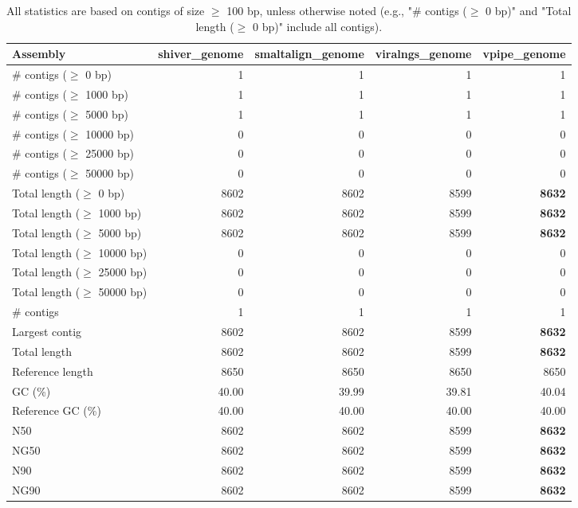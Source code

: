 \documentclass[12pt,a4paper]{article}
\begin{document}
\begin{table}[ht]
\begin{center}
\caption{All statistics are based on contigs of size $\geq$ 100 bp, unless otherwise noted (e.g., "\# contigs ($\geq$ 0 bp)" and "Total length ($\geq$ 0 bp)" include all contigs).}
\begin{tabular}{|l*{4}{|r}|}
\hline
Assembly & shiver\_genome & smaltalign\_genome & viralngs\_genome & vpipe\_genome \\ \hline
\# contigs ($\geq$ 0 bp) & 1 & 1 & 1 & 1 \\ \hline
\# contigs ($\geq$ 1000 bp) & 1 & 1 & 1 & 1 \\ \hline
\# contigs ($\geq$ 5000 bp) & 1 & 1 & 1 & 1 \\ \hline
\# contigs ($\geq$ 10000 bp) & 0 & 0 & 0 & 0 \\ \hline
\# contigs ($\geq$ 25000 bp) & 0 & 0 & 0 & 0 \\ \hline
\# contigs ($\geq$ 50000 bp) & 0 & 0 & 0 & 0 \\ \hline
Total length ($\geq$ 0 bp) & 8602 & 8602 & 8599 & {\bf 8632} \\ \hline
Total length ($\geq$ 1000 bp) & 8602 & 8602 & 8599 & {\bf 8632} \\ \hline
Total length ($\geq$ 5000 bp) & 8602 & 8602 & 8599 & {\bf 8632} \\ \hline
Total length ($\geq$ 10000 bp) & 0 & 0 & 0 & 0 \\ \hline
Total length ($\geq$ 25000 bp) & 0 & 0 & 0 & 0 \\ \hline
Total length ($\geq$ 50000 bp) & 0 & 0 & 0 & 0 \\ \hline
\# contigs & 1 & 1 & 1 & 1 \\ \hline
Largest contig & 8602 & 8602 & 8599 & {\bf 8632} \\ \hline
Total length & 8602 & 8602 & 8599 & {\bf 8632} \\ \hline
Reference length & 8650 & 8650 & 8650 & 8650 \\ \hline
GC (\%) & 40.00 & 39.99 & 39.81 & 40.04 \\ \hline
Reference GC (\%) & 40.00 & 40.00 & 40.00 & 40.00 \\ \hline
N50 & 8602 & 8602 & 8599 & {\bf 8632} \\ \hline
NG50 & 8602 & 8602 & 8599 & {\bf 8632} \\ \hline
N90 & 8602 & 8602 & 8599 & {\bf 8632} \\ \hline
NG90 & 8602 & 8602 & 8599 & {\bf 8632} \\ \hline

\end{tabular}
\end{center}
\end{table}
\end{document}
